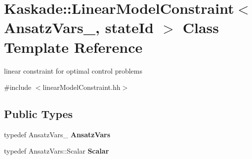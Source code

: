 \hypertarget{classKaskade_1_1LinearModelConstraint}{\section{Kaskade\-:\-:Linear\-Model\-Constraint$<$ Ansatz\-Vars\-\_\-, state\-Id $>$ Class Template Reference}
\label{classKaskade_1_1LinearModelConstraint}
}


linear constraint for optimal control problems  




{\ttfamily \#include $<$linear\-Model\-Constraint.\-hh$>$}

\subsection*{Public Types}
\begin{DoxyCompactItemize}
\item 
\hypertarget{classKaskade_1_1LinearModelConstraint_a24acd13373b4cb4671ca2f0739960c81}{typedef Ansatz\-Vars\-\_\- {\bfseries Ansatz\-Vars}}\label{classKaskade_1_1LinearModelConstraint_a24acd13373b4cb4671ca2f0739960c81}

\item 
\hypertarget{classKaskade_1_1LinearModelConstraint_a2274330d90b73ae4102b67a45c85f2f4}{typedef Ansatz\-Vars\-::\-Scalar {\bfseries Scalar}}\label{classKaskade_1_1LinearModelConstraint_a2274330d90b73ae4102b67a45c85f2f4}

\end{DoxyCompactItemize}
